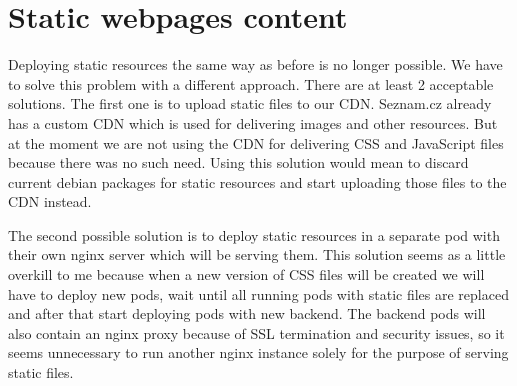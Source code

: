 \chapter{Static webpages content}

Deploying static resources the same way as before is no longer possible. We have to solve this problem with a different approach. There are at least 2 acceptable solutions. The first one is to upload static files to our CDN. Seznam.cz already has a custom CDN which is used for delivering images and other resources. But at the moment we are not using the CDN for delivering CSS and JavaScript files because there was no such need. Using this solution would mean to discard current debian packages for static resources and start uploading those files to the CDN instead. 

The second possible solution is to deploy static resources in a separate pod with their own nginx server which will be serving them. This solution seems as a little overkill to me because when a new version of CSS files will be created we will have to deploy new pods, wait until all running pods with static files are replaced and after that start deploying pods with new backend. The backend pods will also contain an nginx proxy because of SSL termination and security issues, so it seems unnecessary to run another nginx instance solely for the purpose of serving static files.
